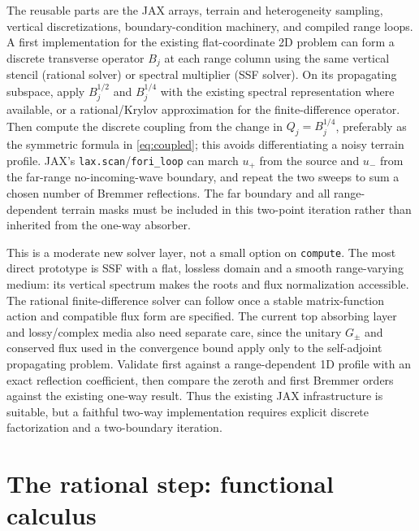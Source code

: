 \documentclass[11pt]{article}
\begin{document}
The reusable parts are the JAX arrays, terrain and heterogeneity sampling,
vertical discretizations, boundary-condition machinery, and compiled range
loops. A first implementation for the existing flat-coordinate 2D problem
can form a discrete transverse operator $B_j$ at each range column using the
same vertical stencil (rational solver) or spectral multiplier (SSF solver).
On its propagating subspace, apply $B_j^{1/2}$ and $B_j^{1/4}$ with the
existing spectral representation where available, or a rational/Krylov
approximation for the finite-difference operator. Then compute the discrete
coupling from the change in $Q_j=B_j^{1/4}$, preferably as the symmetric
formula in \eqref{eq:coupled}; this avoids differentiating a noisy terrain
profile. JAX's \texttt{lax.scan}/\texttt{fori\_loop} can march $u_+$ from the
source and $u_-$ from the far-range no-incoming-wave boundary, and repeat the
two sweeps to sum a chosen number of Bremmer reflections. The far boundary
and all range-dependent terrain masks must be included in this two-point
iteration rather than inherited from the one-way absorber.

This is a moderate new solver layer, not a small option on \texttt{compute}.
The most direct prototype is SSF with a flat, lossless domain and a smooth
range-varying medium: its vertical spectrum makes the roots and flux
normalization accessible. The rational finite-difference solver can follow
once a stable matrix-function action and compatible flux form are specified.
The current top absorbing layer and lossy/complex media also need separate
care, since the unitary $G_\pm$ and conserved flux used in the convergence
bound apply only to the self-adjoint propagating problem. Validate first
against a range-dependent 1D profile with an exact reflection coefficient,
then compare the zeroth and first Bremmer orders against the existing
one-way result. Thus the existing JAX infrastructure is suitable, but a
faithful two-way implementation requires explicit discrete factorization and
a two-boundary iteration.

\section{The rational step: functional calculus}
\end{document}
